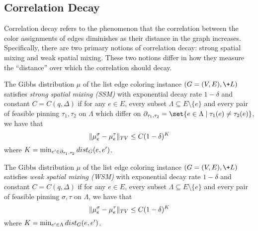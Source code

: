 \subsection{Correlation Decay}\label{sec:prelim-decay}
Correlation decay refers to the phenomenon that the correlation between the color assignments of edges diminishes as their distance in the graph increases. Specifically, there are two primary notions of correlation decay: strong spatial mixing and weak spatial mixing. These two notions differ in how they measure the ``distance'' over which the correlation should decay.
\begin{definition}\label{def:SSM}
    The Gibbs distribution $\mu$ of the list edge coloring instance $(G = (V,E), \+L)$ satisfies \textit{strong spatial mixing (SSM)} with exponential decay rate $1 - \delta$ and constant $C = C(q,\Delta)$ if for any $e \in E$, every subset $\Lambda \subseteq E\setminus \{e\}$ and every pair of feasible pinning $\tau_1,\tau_2$ on $\Lambda$ which differ on $\partial_{\tau_1,\tau_2} = \set{e\in \Lambda\mid \tau_1(e)\neq \tau_2(e)}$, we have that
    $$
        \|\mu_{e}^\sigma - \mu_e^\tau\|_{\-{TV}} \leq C(1 - \delta)^K
    $$
    where $K = \min_{e'\in \partial_{\tau_1,\tau_2}}\-{dist}_{G}(e,e')$.
\end{definition}
\begin{definition}\label{def:WSM}
    The Gibbs distribution $\mu$ of the list edge coloring instance $(G = (V,E), \+L)$ satisfies \textit{weak spatial mixing (WSM)} with exponential decay rate $1 - \delta$ and constant $C = C(q,\Delta)$ if for any $e \in E$, every subset $\Lambda \subseteq E\setminus \{e\}$ and every pair of feasible pinning $\sigma,\tau$ on $\Lambda$, we have that
    $$
        \|\mu_{e}^\sigma - \mu_e^\tau\|_{\-{TV}} \leq C(1 - \delta)^K
    $$
    where $K = \min_{e'\in \Lambda}\-{dist}_{G}(e,e')$.
\end{definition}